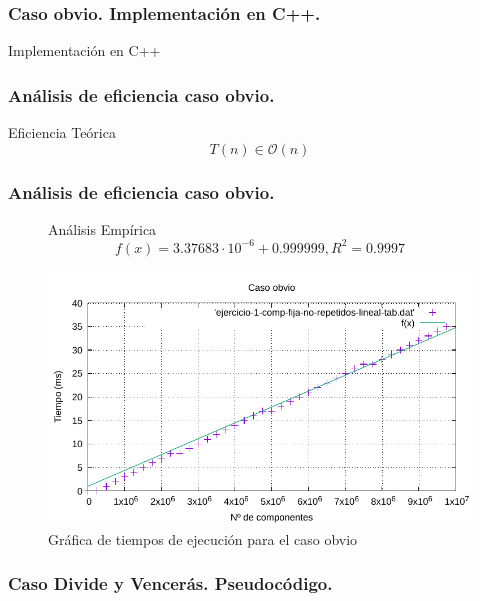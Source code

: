 \documentclass[13pt]{beamer}
\begin{document}
	 \begin{frame}
		\frametitle{Caso obvio. Implementación en C++.}
		\begin{exampleblock}{Implementación en C++}
			 
		\end{exampleblock}	
	\end{frame}

	\begin{frame}
		\frametitle{Análisis de eficiencia caso obvio.}
		 \begin{block}{Eficiencia Teórica}
		 	$$T(n) \in \mathcal{O}(n)$$
		 \end{block}
	\end{frame}
		
	\begin{frame}
		\frametitle{Análisis de eficiencia caso obvio.}
		\begin{figure}
			\begin{block}{Análisis Empírica}
				\begin{equation}
				\boxed{f(x) = 3.37683 \cdot 10^{-6} + 0.999999, R^2 = 0.9997}
				\label{eq:1a-obv-regresion}
				\end{equation}
			\end{block}
			
			\centering
			\includegraphics[scale=0.68]{img/e1a-obv}
			\caption{Gráfica de tiempos de ejecución para el caso obvio}
			\label{fig:1a-obv-graph}
		\end{figure}
	\end{frame}

	\begin{frame}
		\frametitle{Caso Divide y Vencerás. Pseudocódigo.}
		
	\end{frame}
\end{document}
